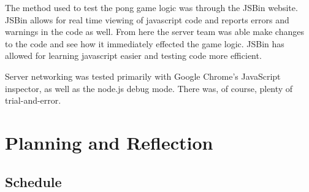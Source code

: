 \documentclass[letterpaper,12pt]{article}
\begin{document}
The method used to test the pong game logic was through the JSBin website. JSBin allows for real time viewing of javascript code and reports errors and warnings in the code as well. From here the server team was able make changes to the code and see how it immediately effected the game logic. JSBin has allowed for learning javascript easier and testing code more efficient.

Server networking was tested primarily with Google Chrome’s JavaScript inspector, as well as the node.js debug mode. There was, of course, plenty of trial-and-error.

\section{Planning and Reflection}
\subsection{Schedule}
\end{document}
